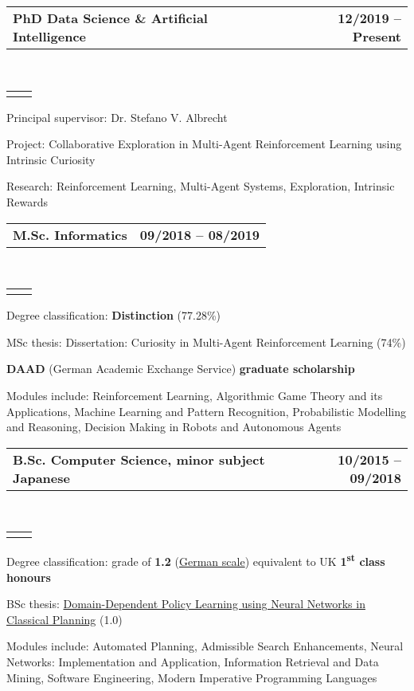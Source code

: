 \documentclass[]{lukas-cv}
\makeatletter
\newcommand{\headerrow}[2]
{\begin{tabular*}{\linewidth}{l@{\extracolsep{\fill}}r}
	\fontspec{Helvetica}\fontsize{12pt}{12pt}\selectfont\bfseries{\color{subheadings}#1} &
	\fontspec{Helvetica}\fontsize{12pt}{12pt}\selectfont\bfseries{\color{subheadings}#2} \\
\end{tabular*}}
\newcommand{\locationrow}[2]
{\begin{tabular*}{\linewidth}{l@{\extracolsep{\fill}}r}
        \color{headings}\scshape\fontspec{Heiti TC Medium}\fontsize{10pt}{12pt}\selectfont{#1}  &
        \color{headings}\scshape\fontspec{Heiti TC Medium}\fontsize{10pt}{12pt}\selectfont{#2}  \\
\end{tabular*}}
\makeatother
\begin{document}
\noindent
\headerrow{PhD Data Science \& Artificial Intelligence}{12/2019 -- Present}
\\
\locationrow{University of Edinburgh}{Edinburgh, United Kingdom}
\begin{tightitemize}{1.7em}
    \item Principal supervisor: Dr. Stefano V. Albrecht
    \item Project: Collaborative Exploration in Multi-Agent Reinforcement Learning using Intrinsic Curiosity
    \item Research: Reinforcement Learning, Multi-Agent Systems, Exploration, Intrinsic Rewards
\end{tightitemize}
\largesectionsep

\noindent
\headerrow{M.Sc. Informatics}{09/2018 -- 08/2019}
\\
\locationrow{University of Edinburgh}{Edinburgh, United Kingdom}
\begin{tightitemize}{1.7em}
    \item Degree classification: \textbf{Distinction} (77.28\%)
    \item MSc thesis: Dissertation: Curiosity in Multi-Agent Reinforcement Learning (74\%)
    \item \textbf{DAAD} (German Academic Exchange Service) \textbf{graduate scholarship}
    \item Modules include: Reinforcement Learning, Algorithmic Game Theory and its Applications, Machine Learning and 
    Pattern Recognition, Probabilistic Modelling and Reasoning, Decision Making in Robots and Autonomous Agents
\end{tightitemize}
\largesectionsep

\noindent
\headerrow{B.Sc. Computer Science, minor subject Japanese}{10/2015 -- 09/2018}
\\
\locationrow{Saarland University}{Saarbrücken, Germany}
\begin{tightitemize}{1.7em}
    \item Degree classification: grade of \textbf{1.2} (\href{https://en.wikipedia.org/wiki/Academic_grading_in_Germany}{German scale}) equivalent to UK \textbf{1\textsuperscript{st} class honours}
    \item BSc thesis: \href{https://www.lukaschaefer.de/assets/files/thesis.pdf}{Domain-Dependent Policy Learning using Neural Networks in Classical Planning} (1.0)
    \item Modules include: Automated Planning, Admissible Search Enhancements, Neural Networks: Implementation and Application, Information Retrieval and Data Mining, Software Engineering, Modern Imperative Programming Languages
\end{tightitemize}
\largesectionsep
\end{document}
